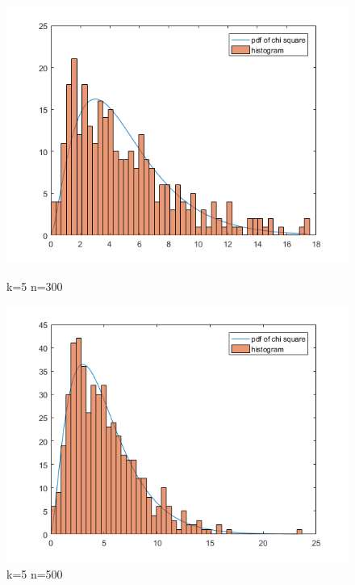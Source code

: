 \documentclass[10pt,a4paper]{report}
\begin{document}
\begin{figure}[ht]
\begin{minipage}[b]{0.5\linewidth}
\centering
\includegraphics[width=\textwidth]{k5n300.png}
\caption{k=5 n=300}
\end{minipage}
\hspace{0.5cm}
\begin{minipage}[b]{0.5\linewidth}
\centering
\includegraphics[width=\textwidth]{k5n500.png}
\caption{k=5 n=500}
\end{minipage}
\end{figure}
\end{document}
